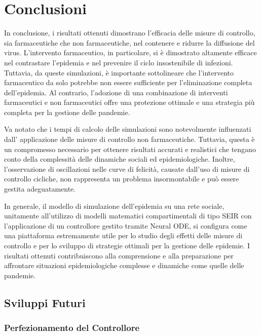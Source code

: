 \section{Conclusioni}

In conclusione, i risultati ottenuti dimostrano  
l'efficacia delle misure di controllo, sia farmaceutiche che non 
farmaceutiche, nel contenere e ridurre la diffusione del virus. 
L'intervento farmaceutico, in particolare, si è dimostrato altamente 
efficace nel contrastare l'epidemia e nel prevenire il ciclo 
insostenibile di infezioni. Tuttavia, da queste simulazioni, è importante sottolineare che 
l'intervento farmaceutico da solo potrebbe non essere sufficiente per 
l'eliminazione completa dell'epidemia. Al contrario, l'adozione di una 
combinazione di interventi farmaceutici e non farmaceutici offre una 
protezione ottimale e una strategia più completa per la gestione delle 
pandemie.

Va notato che i tempi di calcolo delle simulazioni sono notevolmente 
influenzati dall' applicazione delle misure di controllo non farmaceutiche. 
Tuttavia, questa è un compromesso necessario per ottenere risultati 
accurati e realistici che tengano conto della complessità delle dinamiche 
sociali ed epidemiologiche. Inoltre, l'osservazione di oscillazioni 
nelle curve di felicità, causate dall'uso di misure di controllo cicliche, 
non rappresenta un problema insormontabile e può essere gestita 
adeguatamente.

In generale, il modello di simulazione dell'epidemia su una rete sociale,
unitamente all'utilizzo di modelli matematici compartimentali di tipo SEIR
con l'applicazione di un controllore gestito tramite Neural ODE, 
si configura come una piattaforma estremamente utile per lo studio degli 
effetti delle misure di controllo e per lo sviluppo di strategie ottimali 
per la gestione delle epidemie. I risultati ottenuti contribuiscono alla 
comprensione e alla preparazione per affrontare situazioni 
epidemiologiche complesse e dinamiche come quelle delle pandemie.

\subsection{Sviluppi Futuri}

\subsubsection{Perfezionamento del Controllore}

